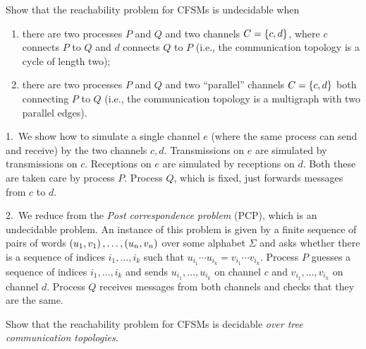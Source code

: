 \begin{exercise}
	Show that the reachability problem for CFSMs is undecidable when
    \begin{enumerate}
        \item there are two processes $P$ and $Q$ and two channels $C = \left\{c, d\right\}$,
        where $c$ connects $P$ to $Q$ and $d$ connects $Q$ to $P$ (i.e., the communication topology is a cycle of length two);
        \item there are two processes $P$ and $Q$ and two ``parallel'' channels $C = \left\{c, d\right\}$
        both connecting $P$ to $Q$ (i.e., the communication topology is a multigraph with two parallel edges).
    \end{enumerate}
\end{exercise}
\begin{solution}
    1.~We show how to simulate a single channel $e$ (where the same process can send and receive)
    by the two channels $c, d$.
    Transmissions on $e$ are simulated by transmissions on $c$.
    Receptions on $e$ are simulated by receptions on $d$.
    Both these are taken care by process $P$.
    Process $Q$, which is fixed, just forwards messages from $c$ to $d$.

    2.~We reduce from the \emph{Post correspondence problem} (PCP), which is an undecidable problem.
    An instance of this problem is given by a finite sequence of pairs of words
    $\left( u_1, v_1 \right), \dots, \left( u_n, v_n \right)$ over some alphabet $\Sigma$
    and asks whether there is a sequence of indices $i_1, \dots, i_k$ such that
    $u_{i_1} \cdots u_{i_k} = v_{i_1} \cdots v_{i_k}$.
    Process $P$ guesses a sequence of indices $i_1, \dots, i_k$
    and sends $u_{i_1}, \dots, u_{i_k}$ on channel $c$
    and $v_{i_1}, \dots, v_{i_k}$ on channel $d$.
    Process $Q$ receives messages from both channels and checks that they are the same.
\end{solution}

\begin{exercise}
	Show that the reachability problem for CFSMs is decidable \emph{over tree communication topologies}.
\end{exercise}

